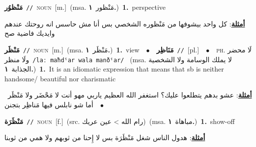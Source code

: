 \documentclass[10pt,a4paper,twoside]{article} %
\begin{document}
\begin{multicols}{2}
{\setlength\topsep{0pt}\textbf{\foreignlanguage{arabic}{مَنْظوُر}}\ {\color{gray}\texttt{//}\color{black}}\ \textsc{noun}\ [m.]\ \color{gray}(msa. \foreignlanguage{arabic}{مَنْظور}~\foreignlanguage{arabic}{\textbf{١.}})\color{black}\ \textbf{1.}~perspective\  \begin{flushright}\color{gray}\foreignlanguage{arabic}{\textbf{\underline{\foreignlanguage{arabic}{أمثلة}}}: كل واحد بيشوفها من مَنْظوره الشخصي بس أنا مش حاسس انه روحتك عندهم وايديك فاضية صح}\end{flushright}\color{black}} \vspace{2mm}

{\setlength\topsep{0pt}\textbf{\foreignlanguage{arabic}{مَنْظَر}}\ {\color{gray}\texttt{//}\color{black}}\ \textsc{noun}\ [m.]\ \color{gray}(msa. \foreignlanguage{arabic}{مَنْظَر}~\foreignlanguage{arabic}{\textbf{١.}})\color{black}\ \textbf{1.}~view\ \ $\bullet$\ \ \setlength\topsep{0pt}\textbf{\foreignlanguage{arabic}{مَنَاظِر}}\ {\color{gray}\texttt{//}\color{black}}\ [pl.]\ \ $\bullet$\ \ \textsc{ph.} \color{gray} \foreignlanguage{arabic}{لَا محضر ولَا منظر}\color{black}\ {\color{gray}\texttt{/{\sffamily laː maħdˤar wala manðˤar}/}\color{black}}\ \color{gray} (msa. \foreignlanguage{arabic}{لا يملك الوسامة ولا الشخصية الجذابة}~\foreignlanguage{arabic}{\textbf{١.}})\color{black}\ \textbf{1.}~It is an idiomatic expression that means that sb is neither handsome/ beautiful nor charismatic\  \begin{flushright}\color{gray}\foreignlanguage{arabic}{\textbf{\underline{\foreignlanguage{arabic}{أمثلة}}}: عشو بدهم يتطلعوا عليك؟ استغفر الله العظيم ياربي مهو أنت لا مَحْضَر ولا مَنْظَر\ $\bullet$\ \  أما شو نابلس فيها مَناظِر بتجنن}\end{flushright}\color{black}} \vspace{2mm}

{\setlength\topsep{0pt}\textbf{\foreignlanguage{arabic}{مَنْظَرَة}}\ {\color{gray}\texttt{//}\color{black}}\ \textsc{noun}\ [f.]\ (src. \color{gray}\foreignlanguage{arabic}{رام الله > عين عريك}\color{black})\ \color{gray}(msa. \foreignlanguage{arabic}{مباهاة}~\foreignlanguage{arabic}{\textbf{١.}})\color{black}\ \textbf{1.}~show-off\  \begin{flushright}\color{gray}\foreignlanguage{arabic}{\textbf{\underline{\foreignlanguage{arabic}{أمثلة}}}: هدول الناس شغل مَنْظَرَة بس لا إِحنا من ثوبهم ولا همي من ثوبنا}\end{flushright}\color{black}} \vspace{2mm}


\end{multicols}
\end{document}

